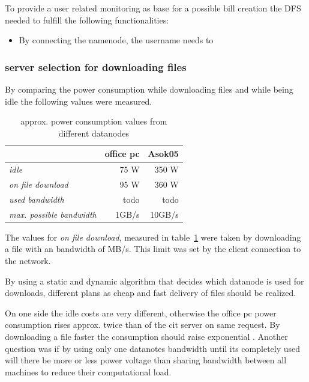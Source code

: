 To provide a user related monitoring as base for a possible bill creation the DFS needed to fulfill the following functionalities:

\begin{itemize}
\item By connecting the namenode, the username needs to 
\end{itemize}

\subsubsection{server selection for downloading files}

By comparing the power consumption while downloading files and while being idle the following values were measured.

\begin{table}
	\centering
	\caption{approx. power consumption values from different datanodes}	
	\begin{tabular}{|l|r|r|}
		\hline \rule[-2ex]{0pt}{5.5ex}  & \textbf{office pc} & \textbf{Asok05} \\ 
		\hline \rule[-2ex]{0pt}{5.5ex} \textit{idle} &   75 W &   350 W \\ 
		\hline \rule[-2ex]{0pt}{5.5ex} \textit{on file download} &   95 W &   360 W \\ 
		\hline \rule[-2ex]{0pt}{5.5ex} \textit{used bandwidth} & todo & todo \\
		\hline \rule[-2ex]{0pt}{5.5ex} \textit{max. possible bandwidth} & 1GB/s & 10GB/s \\
		\hline
	\end{tabular} 
	\label{tab:powerconsumptionvalues}
\end{table}

The values for \textit{on file download}, measured in table~\ref{tab:powerconsumptionvalues} were taken by downloading a file with an bandwidth of  MB/s. This limit was set by the client connection to the network.

By using a static and dynamic algorithm that decides which datanode is used for downloads, different plans as cheap and fast delivery of files should be realized.

On one side the idle costs are very different, otherwise the office pc power consumption rises approx. twice than of the cit server on same request. By downloading a file faster the consumption should raise exponential . Another question was if by using only one datanotes bandwidth until its completely used will there be more or less power voltage than sharing bandwidth between all machines to reduce their computational load. 


